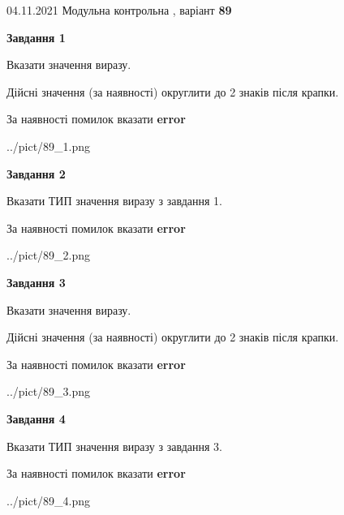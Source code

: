 \documentclass[11pt, ukrainian]{article}
\begin{document}
{04.11.2021 Модульна контрольна , варіант  \No \textbf { 89 }\par}
{
\begin {large}
{\begin {center}\textbf{Завдання 1}\end {center}}\par
Вказати значення виразу. \par
Дійсні значення (за наявності) округлити до 2 знаків після крапки. \par
За наявності помилок вказати \textbf{error}

\begin{center}
	{../pict/89_1.png}
\end{center}
\newpage

{\begin {center}\textbf{Завдання 2}\end {center}}\par
Вказати ТИП значення виразу з завдання 1. \par
За наявності помилок вказати \textbf{error}

\begin{center}
	{../pict/89_2.png}
\end{center}
\newpage

{\begin {center}\textbf{Завдання 3}\end {center}}\par
Вказати значення виразу. \par
Дійсні значення (за наявності) округлити до 2 знаків після крапки. \par
За наявності помилок вказати \textbf{error}

\begin{center}
	{../pict/89_3.png}
\end{center}
\newpage

{\begin {center}\textbf{Завдання 4}\end {center}}\par
Вказати ТИП значення виразу з завдання 3. \par
За наявності помилок вказати \textbf{error}

\begin{center}
	{../pict/89_4.png}
\end{center}
\newpage


\end{large}}
\end{document}
